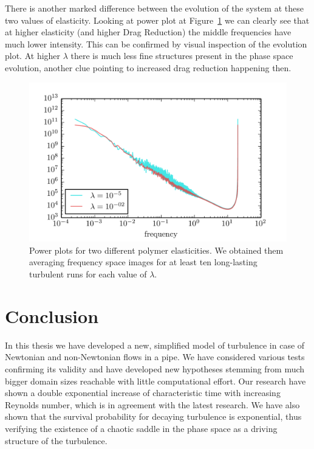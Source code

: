 \documentclass[11pt,a4paper]{article}
\begin{document}
There is another marked difference between the evolution of the system at these two values of elasticity.
Looking at power plot at Figure~\ref{img:fourier} we can clearly see that at higher elasticity (and higher Drag Reduction) the middle frequencies have much lower intensity.
This can be confirmed by visual inspection of the evolution plot.
At higher $\lambda$ there is much less fine structures present in the phase space evolution, another clue pointing to increased drag reduction happening then.

\begin{figure}[H]
    \centering
    \includegraphics[width=\textwidth]{fourier}
    \caption{Power plots for two different polymer elasticities. We obtained them averaging frequency space images for at least ten long-lasting turbulent runs for each value of $\lambda$.}\label{img:fourier}
\end{figure}

\section{Conclusion}

In this thesis we have developed a new, simplified model of turbulence in case of Newtonian and non-Newtonian flows in a pipe.
We have considered various tests confirming its validity and have developed new hypotheses stemming from much bigger domain sizes reachable with little computational effort.
Our research have shown a double exponential increase of characteristic time with increasing Reynolds number, which is in agreement with the latest research.
We have also shown that the survival probability for decaying turbulence is exponential, thus verifying  the existence of a chaotic saddle in the phase space as a driving structure of the turbulence.
\end{document}
